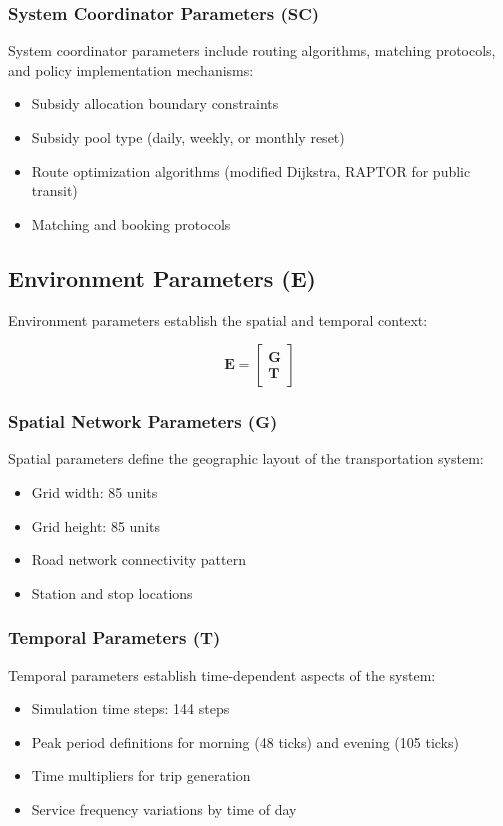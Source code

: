 \subsubsection{System Coordinator Parameters \texorpdfstring{($\mathbf{SC}$)}{(SC)}}
System coordinator parameters include routing algorithms, matching protocols, and policy implementation mechanisms:
\begin{itemize}
    \item Subsidy allocation boundary constraints
    \item Subsidy pool type (daily, weekly, or monthly reset)
    \item Route optimization algorithms (modified Dijkstra, RAPTOR for public transit)
    \item Matching and booking protocols
\end{itemize}

\subsection{Environment Parameters \texorpdfstring{($\mathbf{E}$)}{(E)}}
Environment parameters establish the spatial and temporal context:

\begin{equation}
\mathbf{E} = \begin{bmatrix} \mathbf{G} \\ \mathbf{T} \end{bmatrix}
\end{equation}

\subsubsection{Spatial Network Parameters \texorpdfstring{($\mathbf{G}$)}{(G)}}
Spatial parameters define the geographic layout of the transportation system:
\begin{itemize}
    \item Grid width: 85 units
    \item Grid height: 85 units
    \item Road network connectivity pattern
    \item Station and stop locations
\end{itemize}

\subsubsection{Temporal Parameters \texorpdfstring{($\mathbf{T}$)}{(T)}}
Temporal parameters establish time-dependent aspects of the system:
\begin{itemize}
    \item Simulation time steps: 144 steps
    \item Peak period definitions for morning (48 ticks) and evening (105 ticks)
    \item Time multipliers for trip generation
    \item Service frequency variations by time of day
\end{itemize}

